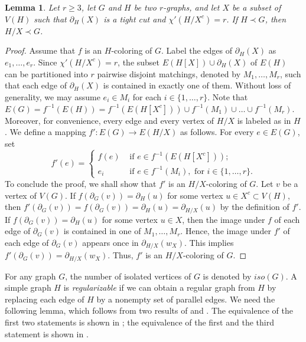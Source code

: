 \documentclass[a4paper,11pt]{article}
\newtheorem{lem}[defi]{Lemma}
\theoremstyle{remark}
\begin{document}
\begin{lem}\label{Lemma-H-noclass1-subgraph}
	Let $r \geq 3$, let $ G $ and $ H $ be two $ r $-graphs, and let $ X $ be a subset of $ V(H) $ such that $ \partial_H(X) $ is a tight cut and $ \chi'(H/X^c)= r$. If  $H\prec G $,  then $H/X \prec G $.
\end{lem}

\begin{proof}
	Assume that $f$ is an $H$-coloring of $G$. 
	Label the edges of $\partial_H(X)$ as $ e_1,\ldots, e_r $.
	Since $ \chi'(H/X^c)= r$,  
	the subset  $ E(H[X])\cup \partial_H(X)$ of $ E(H) $ can be partitioned into $ r $ pairwise disjoint matchings, denoted by $ M_1,\ldots, M_r $, such that each edge of $ \partial_H(X) $ is contained in exactly one of them. Without loss of generality, we may assume $ e_i\in M_i $ for each $i\in\{1,\ldots,r\} $.  Note that $ E(G)= f^{-1}(E(H))= f^{-1}(E(H[X^c]))\cup f^{-1}(M_1)\cup\ldots\cup f^{-1}(M_r)$.
	Moreover, for convenience, every edge and every vertex  of $ H/X $ is
	labeled as in $H$. We define a mapping $f'\colon E(G)\to E(H/X)$ as follows. For every $e\in E(G)$, set  $$f'(e)=\begin{cases}
		f(e) & \text{ if } e\in  f^{-1}(E(H[X^c])); \\
		e_i & \text{ if } e\in f^{-1}(M_i), \text{ for } i\in\{1,\ldots,r\}.
	\end{cases}$$ 
	To conclude the proof, we shall show that  $f'$ is an $ H/X $-coloring of $ G $.  Let $ v$ be a vertex of $V(G) $. If $f(\partial_G(v)) =\partial_H(u)$ for some vertex $ u\in  X^c\subset V(H) $, then $f'(\partial_G(v)) =f(\partial_G(v)) =\partial_H(u)=\partial_{H/X}(u)$ by the definition of $ f' $. If $f(\partial_G(v)) =\partial_H(u)$ for some vertex $ u\in X $, then  the image  under $ f $ of each edge of $ \partial_G(v) $ is contained in one of $ M_1, \ldots, M_r $. Hence, the image  under $ f' $ of each edge of $ \partial_G(v) $ appears once in $ \partial_{H/X}(w_X) $. This implies $f'(\partial_G(v))=\partial_{H/X}(w_X)$. Thus, $f'$ is an $ H/X $-coloring of $ G $.
\end{proof}

For any graph $ G $, the number of isolated vertices of $ G $ is denoted by $ iso(G) $.
A simple graph $ H $ is \emph{regularizable} if we can obtain a regular graph from $H $ by replacing each edge of $ H $ by a nonempty set of parallel edges. We need the following lemma, which follows from two results of \cite{Berge-Vergnas-1978} and \cite{Pulleyblank-1979}. The equivalence of the first two statements is shown in \cite{Berge-Vergnas-1978}; the equivalence of the first and the third statement is shown in \cite{Pulleyblank-1979}.
\end{document}

